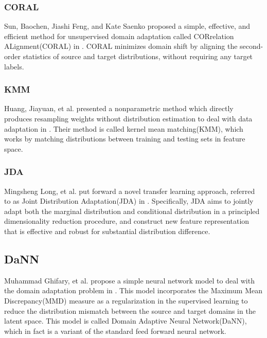\documentclass[conference]{IEEEtran}
\begin{document}
\subsubsection{CORAL}
Sun, Baochen, Jiashi Feng, and Kate Saenko proposed a simple, effective, and efficient method for unsupervised domain adaptation called CORrelation ALignment(CORAL) in \cite{CORAL}. CORAL minimizes domain shift by aligning the second-order statistics of source and target distributions, without requiring any target labels.
\subsubsection{KMM}
Huang, Jiayuan, et al. presented a nonparametric method which directly produces resampling weights without distribution estimation to deal with data adaptation in \cite{KMM}. Their method is called kernel mean matching(KMM), which works by matching distributions between training and testing sets in feature space.
\subsubsection{JDA}
Mingsheng Long, et al. put forward a novel transfer learning approach, referred to as Joint Distribution Adaptation(JDA) in \cite{JDA}. Specifically, JDA aims to jointly adapt both the marginal distribution and conditional distribution in a principled dimensionality reduction procedure, and construct new feature representation that is effective and robust for substantial distribution difference. 
\subsection{DaNN}
Muhammad Ghifary, et al. propose a simple neural network model to deal with the domain adaptation problem in \cite{DaNN}. This model incorporates the Maximum Mean Discrepancy(MMD) measure as a regularization in the supervised learning to reduce the distribution mismatch between the source and target domains in the latent space. This model is called Domain Adaptive Neural Network(DaNN), which in fact is a variant of the standard feed forward neural network.
\end{document}
